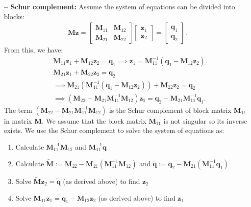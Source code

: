 \documentclass[lang=cn,10pt]{gorgeousnbook}
\numberwithin{equation}{section}%
\numberwithin{figure}{section}%
\begin{document}
\hfill\break
\textbf{-- Schur complement:}
Assume the system of equations can be divided into blocks:
\begin{align*}
\boldsymbol{Mz} =
\begin{bmatrix}
\boldsymbol{M}_{11} & \boldsymbol{M}_{12} \\
\boldsymbol{M}_{21} & \boldsymbol{M}_{22}
\end{bmatrix}
\begin{bmatrix}
\boldsymbol{z}_1 \\
\boldsymbol{z}_2
\end{bmatrix} 
=
\begin{bmatrix}
\boldsymbol{q}_1 \\
\boldsymbol{q}_2
\end{bmatrix}.
\end{align*}
From this, we have:
\begin{align*}
& \boldsymbol{M}_{11} \boldsymbol{z}_1 + \boldsymbol{M}_{12} \boldsymbol{z}_2 = \boldsymbol{q}_1 \implies \boldsymbol{z}_1 = \boldsymbol{M}_{11}^{-1} (\boldsymbol{q}_1 - \boldsymbol{M}_{12} \boldsymbol{z}_2). \\
& \boldsymbol{M}_{21} \boldsymbol{z}_1 + \boldsymbol{M}_{22} \boldsymbol{z}_2 = \boldsymbol{q}_2 \\
&\implies \boldsymbol{M}_{21} (\boldsymbol{M}_{11}^{-1} (\boldsymbol{q}_1 - \boldsymbol{M}_{12} \boldsymbol{z}_2)) + \boldsymbol{M}_{22} \boldsymbol{z}_2 = \boldsymbol{q}_2 \\
& \implies (\boldsymbol{M}_{22} - \boldsymbol{M}_{21}\boldsymbol{M}_{11}^{-1}\boldsymbol{M}_{12}) \boldsymbol{z}_2 = \boldsymbol{q}_2 - \boldsymbol{M}_{21} \boldsymbol{M}_{11}^{-1} \boldsymbol{q}_1.
\end{align*}
The term $(\boldsymbol{M}_{22} - \boldsymbol{M}_{21}\boldsymbol{M}_{11}^{-1}\boldsymbol{M}_{12})$ is the Schur complement \cite{zhang2006schur} of block matrix $\boldsymbol{M}_{11}$ in matrix $\boldsymbol{M}$.
We assume that the block matrix $\boldsymbol{M}_{11}$ is not singular so its inverse exists. 
We use the Schur complement to solve the system of equations as:
\begin{enumerate}
\item Calculate $\boldsymbol{M}_{11}^{-1} \boldsymbol{M}_{12}$ and $\boldsymbol{M}_{11}^{-1} \boldsymbol{q}$
\item Calculate $\widetilde{\boldsymbol{M}} := \boldsymbol{M}_{22} - \boldsymbol{M}_{21}(\boldsymbol{M}_{11}^{-1}\boldsymbol{M}_{12})$ and $\widetilde{\boldsymbol{q}} := \boldsymbol{q}_2 - \boldsymbol{M}_{21} (\boldsymbol{M}_{11}^{-1} \boldsymbol{q}_1)$
\item Solve $\widetilde{\boldsymbol{M}} \boldsymbol{z}_2 = \widetilde{\boldsymbol{q}}$ (as derived above) to find $\boldsymbol{z}_2$
\item Solve $\boldsymbol{M}_{11} \boldsymbol{z}_1 = \boldsymbol{q}_1 - \boldsymbol{M}_{12} \boldsymbol{z}_2$ (as derived above) to find $\boldsymbol{z}_1$
\end{enumerate}
\end{document}
